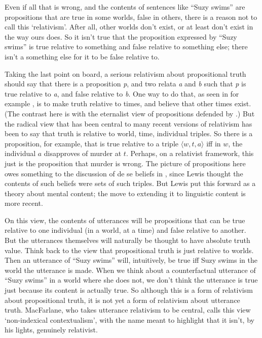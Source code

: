 Even if all that is wrong, and the contents of sentences like ``Suzy swims'' are propositions that are true in some worlds, false in others, there is a reason not to call this `relativism'. After all, other worlds don't exist, or at least don't exist in the way ours does. So it isn't true that the proposition expressed by ``Suzy swims'' is true relative to something and false relative to something else; there isn't a something else for it to be false relative to. 

Taking the last point on board, a serious relativism about propositional truth should say that there is a proposition \emph{p}, and two relata \emph{a} and \emph{b} such that \emph{p} is true relative to \emph{a}, and false relative to \emph{b}. One way to do that, as seen in for example  \citet{Kaplan1977}, is to make truth relative to times, and believe that other times exist. (The contrast here is with the eternalist view of propositions defended by  \citet{Evans1985}.) But the radical view that has been central to many recent versions of relativism has been to say that truth is relative to world, time, individual triples. So there is a proposition, for example, that is true relative to a triple $\langle w, t, a \rangle$ iff in $w$, the individual $a$ disapproves of murder at $t$. Perhaps, on a relativist framework, this just is the proposition that murder is wrong. The picture of propositions here owes something to the discussion of de se beliefs in  \citet{Lewis1979b}, since Lewis thought the contents of such beliefs were sets of such triples. But Lewis put this forward as a theory about mental content; the move to extending it to linguistic content is more recent.

On this view, the contents of utterances will be propositions that can be true relative to one individual (in a world, at a time) and false relative to another. But the utterances themselves will naturally be thought to have absolute truth value. Think back to the view that propositional truth is just relative to worlds. Then an utterance of ``Suzy swims'' will, intuitively, be true iff Suzy swims in the world the utterance is made. When we think about a counterfactual utterance of ``Suzy swims'' in a world where she does not, we don't think the utterance is true just because its content is actually true. So although this is a form of relativism about propositional truth, it is not yet a form of relativism about utterance truth. MacFarlane, who takes utterance relativism to be central, calls this view `non-indexical contextualism', with the name meant to highlight that it isn't, by his lights, genuinely relativist. 

